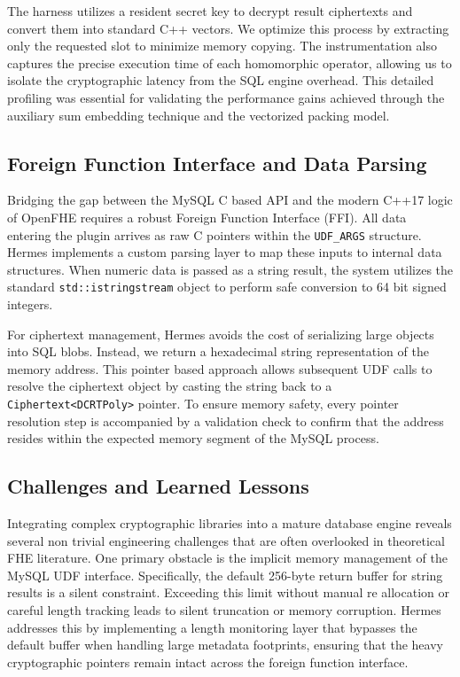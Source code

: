 \documentclass[sigconf,nonacm]{acmart}
\begin{document}
The harness utilizes a resident secret key to decrypt result ciphertexts and convert them into standard C++ vectors. We optimize this process by extracting only the requested slot to minimize memory copying. The instrumentation also captures the precise execution time of each homomorphic operator, allowing us to isolate the cryptographic latency from the SQL engine overhead. This detailed profiling was essential for validating the performance gains achieved through the auxiliary sum embedding technique and the vectorized packing model.

\subsection{Foreign Function Interface and Data Parsing}

Bridging the gap between the MySQL C based API and the modern C++17 logic of OpenFHE requires a robust Foreign Function Interface (FFI). All data entering the plugin arrives as raw C pointers within the \texttt{UDF\_ARGS} structure. Hermes implements a custom parsing layer to map these inputs to internal data structures. When numeric data is passed as a string result, the system utilizes the standard \texttt{std::istringstream} object to perform safe conversion to 64 bit signed integers.

For ciphertext management, Hermes avoids the cost of serializing large objects into SQL blobs. Instead, we return a hexadecimal string representation of the memory address. This pointer based approach allows subsequent UDF calls to resolve the ciphertext object by casting the string back to a \texttt{Ciphertext<DCRTPoly>} pointer. To ensure memory safety, every pointer resolution step is accompanied by a validation check to confirm that the address resides within the expected memory segment of the MySQL process.

\subsection{Challenges and Learned Lessons}

Integrating complex cryptographic libraries into a mature database engine reveals several non trivial engineering challenges that are often overlooked in theoretical FHE literature. One primary obstacle is the implicit memory management of the MySQL UDF interface. Specifically, the default 256-byte return buffer for string results is a silent constraint. Exceeding this limit without manual re allocation or careful length tracking leads to silent truncation or memory corruption. Hermes addresses this by implementing a length monitoring layer that bypasses the default buffer when handling large metadata footprints, ensuring that the heavy cryptographic pointers remain intact across the foreign function interface.
\end{document}
